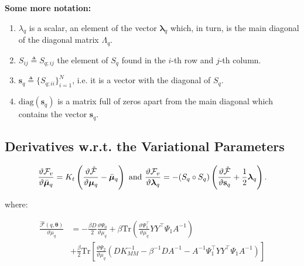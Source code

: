 \textbf{Some more notation:} 
\begin{enumerate}
\item $\lambda_q$ is a scalar, an element of the vector $\boldsymbol
  \lambda_q$ which, in turn, is the main diagonal of the diagonal
  matrix $\Lambda_q$.
\item $S_{ij} \triangleq S_{q;ij}$ the element of $S_q$ found in the
  $i$-th row and $j$-th column.
\item $\mathbf{s}_q \triangleq \lbrace S_{q;ii} \rbrace_{i=1}^N$,
  i.e. it is a vector with the diagonal of $S_q$.
\item $\text{diag}(\mathbf{s}_q)$ is a matrix full of zeros apart from
  the main diagonal which contains the vector $\mathbf{s}_q$.
\end{enumerate}

\subsection{Derivatives w.r.t. the Variational Parameters}
\begin{equation}
    \label{derivVarParamSuppl}
\frac{\vartheta \mathcal{F}_v}{\vartheta \bar{\boldsymbol \mu}_q} 
=  K_t \left( \frac{\vartheta \hat{\mathcal{F}}}{\vartheta \boldsymbol \mu_q} - \bar{\boldsymbol \mu}_q \right)
\text{ and }
 \frac{\vartheta \mathcal{F}_v}{\vartheta \boldsymbol \lambda_q}
= - ( S_q \circ S_q) \left( \frac{\vartheta \hat{\mathcal{F}}}{\vartheta \mathbf{s}_q} + \frac{1}{2} \boldsymbol \lambda_q \right).
\end{equation}

where:

\begin{align}
 \frac{\hat{\mathcal{F}}(q, \boldsymbol \theta)}{\vartheta \mu_q}
{}& = - \frac{\beta D}{2} \frac{\vartheta \Psi_0}{\vartheta \mu_q}
    + \beta \text{Tr} \left(\frac{\vartheta \Psi_1^\top}{\vartheta \mu_q} Y Y^\top \Psi_1 A^{-1} \right) \nonumber \\
{}& + \frac{\beta}{2} \text{Tr} \left[ \frac{\vartheta \Psi_2}{\vartheta \mu_q}
       \left(
	  D K_{MM}^{-1} - \beta^{-1} D A^{-1} - A^{-1} \Psi_1^\top Y Y^\top \Psi_1 A^{-1}
       \right) \right] \label{derivFTildeEfficientComputationMu}
\end{align}


